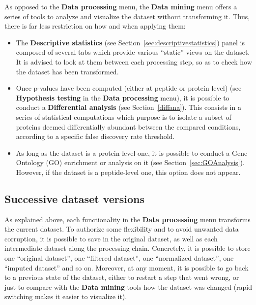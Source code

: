 \documentclass[12pt]{article}
\begin{document}
As opposed to the \textbf{Data processing} menu, the \textbf{Data mining} menu offers a series of tools to analyze and visualize the dataset without transforming it. Thus, there is far less restriction on how and when applying them:
\begin{itemize}
	\item The \textbf{Descriptive statistics} (see Section~\ref{sec:descriptivestatistics}) panel is composed of several tabs which provide various ``static'' views on the dataset. It is advised to look at them between each processing step, so as to check how the dataset has been transformed.
	\item Once p-values have been computed (either at peptide or protein level) (see \textbf{Hypothesis testing} in the \textbf{Data processing} menu), it is possible to conduct a \textbf{Differential analysis} (see Section~\ref{diffana}). This consists in a series of statistical computations which purpose is to isolate a subset of proteins deemed differentially abundant between the compared conditions, according to a specific false discovery rate threshold.
	\item As long as the dataset is a protein-level one, it is possible to conduct a Gene Ontology (GO) enrichment or analysis on it (see Section~\ref{sec:GOAnalysis}). However, if the dataset is a peptide-level one, this option does not appear.
\end{itemize}

\subsection{Successive dataset versions}\label{sec:availabledatasets}

As explained above, each functionality in the \textbf{Data processing} menu transforms the current dataset.
To authorize some flexibility and to avoid unwanted data corruption, it is possible to save in  
the original dataset, as well as each intermediate dataset along the processing chain. Concretely, it is possible
to store one ``original dataset'', one ``filtered dataset'', one ``normalized dataset'', one ``imputed dataset'' and so on.
Moreover, at any moment, it is possible to go back to a previous state of the dataset, either to restart a step that went wrong,
or just to compare with the \textbf{Data mining} tools how the dataset was changed (rapid switching makes it easier to visualize it).
\end{document}
